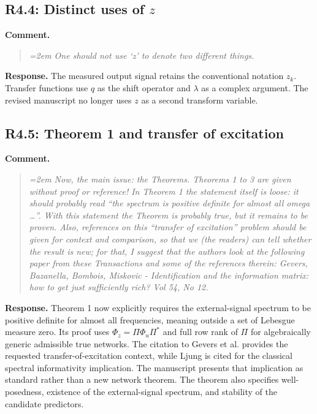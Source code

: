 \documentclass[11pt]{article}
\begin{document}
\subsection*{R4.4: Distinct uses of $z$}
\textbf{Comment.}
\begin{quote}\itshape\emergencystretch=2em
One should not use \textquoteleft{}z\textquoteright{} to denote two different things.
\end{quote}

\textbf{Response.} The measured output signal retains the conventional
notation $z_k$. Transfer functions use $q$ as the shift operator and
$\lambda$ as a complex argument. The revised manuscript no longer uses
$z$ as a second transform variable.

\subsection*{R4.5: Theorem 1 and transfer of excitation}
\textbf{Comment.}
\begin{quote}\itshape\emergencystretch=2em
Now, the main issue: the Theorems. Theorems 1 to 3 are given without proof or reference! In Theorem 1 the statement itself is loose: it should probably read ``the spectrum is positive definite for almost all omega \ldots{}''. With this statement the Theorem is probably true, but it remains to be proven. Also, references on this ``transfer of excitation'' problem should be given for context and comparison, so that we (the readers) can tell whether the result is new; for that, I suggest that the authors look at the following paper from these Transactions and some of the references therein: Gevers, Bazanella, Bombois, Miskovic - Identification and the information matrix: how to get just sufficiently rich? Vol 54, No 12.
\end{quote}

\textbf{Response.} Theorem 1 now explicitly requires the external-signal
spectrum to be positive definite for almost all frequencies, meaning
outside a set of Lebesgue measure zero. Its proof uses
$\Phi_z=\Pi\Phi_u\Pi^*$ and full row rank of $\Pi$ for algebraically
generic admissible true networks. The citation to Gevers et al. provides
the requested transfer-of-excitation context, while Ljung is cited for
the classical spectral informativity implication. The manuscript presents
that implication as standard rather than a new network theorem.
The theorem also specifies well-posedness, existence of the
external-signal spectrum, and stability of the candidate predictors.
\end{document}
